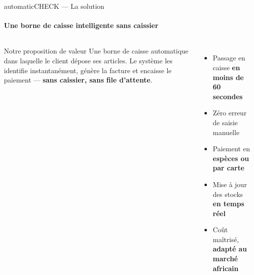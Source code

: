 \documentclass[aspectratio=169, 10pt]{beamer}
\begin{document}

\begin{frame}[shrink=5]{automaticCHECK — La solution}
  \framesubtitle{Une borne de caisse intelligente sans caissier}

  \vspace{0.1cm}
  \begin{columns}[c]

      \begin{block}{Notre proposition de valeur}
        \vspace{0.05cm}
        Une borne de caisse automatique dans laquelle le client dépose ses
        articles. Le système les identifie instantanément, génère la facture et
        encaisse le paiement — \textbf{sans caissier, sans file d'attente}.
      \end{block}

      \vspace{0.2cm}

      \begin{itemize}\setlength\itemsep{0.2cm}
        \item[\faCheck] Passage en caisse \textbf{en moins de 60 secondes}
        \item[\faCheck] Zéro erreur de saisie manuelle
        \item[\faCheck] Paiement en \textbf{espèces ou par carte}
        \item[\faCheck] Mise à jour des stocks \textbf{en temps réel}
        \item[\faCheck] Coût maîtrisé, \textbf{adapté au marché africain}
      \end{itemize}

      \centering
  \end{columns}

\end{frame}
\end{document}
